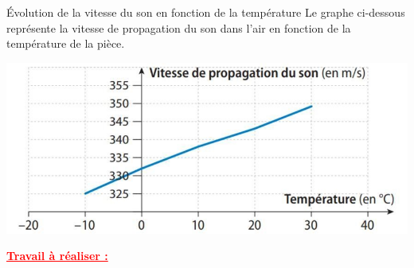 \begin{doc}{\'{E}volution de la vitesse du son en fonction de la température}
Le graphe ci-dessous représente la vitesse de propagation du son dans l'air en fonction de la température de la pièce.
\begin{center}
    \includegraphics[scale=0.9]{Images/Courbe_VitesseTemp.jpg}
  \end{center}

\end{doc}
\begin{large}
    \textbf{\textcolor{red}{\underline{Travail à réaliser :}}}
\end{large}
\\

